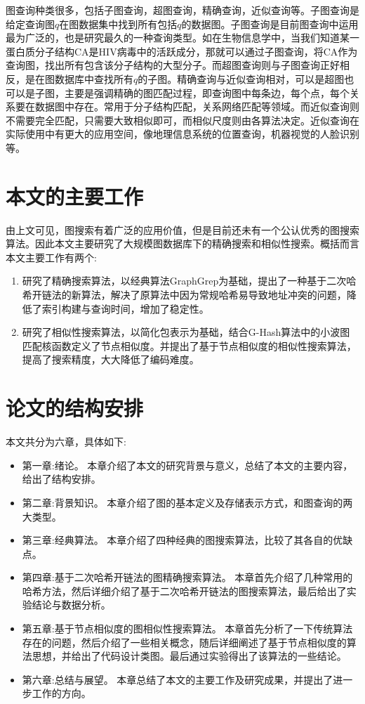 \documentclass{XDBAthesis}
\begin{document}
图查询种类很多，包括子图查询，超图查询，精确查询，近似查询等\cite{g13}。子图查询是给定查询图$q$在图数据集中找到所有包括$q$的数据图。子图查询是目前图查询中运用最为广泛的，也是研究最久的一种查询类型。如在生物信息学中\cite{g13}，当我们知道某一蛋白质分子结构CA是HIV病毒中的活跃成分，那就可以通过子图查询，将CA作为查询图，找出所有包含该分子结构的大型分子。而超图查询则与子图查询正好相反，是在图数据库中查找所有$q$的子图。精确查询与近似查询相对，可以是超图也可以是子图，主要是强调精确的图匹配过程，即查询图中每条边，每个点，每个关系要在数据图中存在。常用于分子结构匹配，关系网络匹配等领域。而近似查询则不需要完全匹配，只需要大致相似即可，而相似尺度则由各算法决定。近似查询在实际使用中有更大的应用空间，像地理信息系统的位置查询，机器视觉的人脸识别等\cite{g13}。

\section{本文的主要工作}
由上文可见，图搜索有着广泛的应用价值，但是目前还未有一个公认优秀的图搜索算法。因此本文主要研究了大规模图数据库下的精确搜索和相似性搜索。概括而言本文主要工作有两个:
\begin{enumerate}
    \item 研究了精确搜索算法，以经典算法GraphGrep\cite{graphgrep}为基础，提出了一种基于二次哈希开链法的新算法，解决了原算法中因为常规哈希易导致地址冲突的问题，降低了索引构建与查询时间，增加了稳定性。
    \item 研究了相似性搜索算法，以简化包表示为基础，结合G-Hash\cite{ghash}算法中的小波图匹配核函数定义了节点相似度。并提出了基于节点相似度的相似性搜索算法，提高了搜索精度，大大降低了编码难度。
\end{enumerate}
\section{论文的结构安排}
本文共分为六章，具体如下:
\begin{itemize}
    \item 第一章:绪论。 本章介绍了本文的研究背景与意义，总结了本文的主要内容，给出了结构安排。
    \item 第二章:背景知识。 本章介绍了图的基本定义及存储表示方式，和图查询的两大类型。
    \item 第三章:经典算法。 本章介绍了四种经典的图搜索算法，比较了其各自的优缺点。
    \item 第四章:基于二次哈希开链法的图精确搜索算法。 本章首先介绍了几种常用的哈希方法，然后详细介绍了基于二次哈希开链法的图搜索算法，最后给出了实验结论与数据分析。
    \item 第五章:基于节点相似度的图相似性搜索算法。 本章首先分析了一下传统算法存在的问题，然后介绍了一些相关概念，随后详细阐述了基于节点相似度的算法思想，并给出了代码设计类图。最后通过实验得出了该算法的一些结论。
    \item 第六章:总结与展望。 本章总结了本文的主要工作及研究成果，并提出了进一步工作的方向。
\end{itemize}



\ifx\allfiles\undefined
\renewcommand\refname{参考文献}
%

\end{document}
